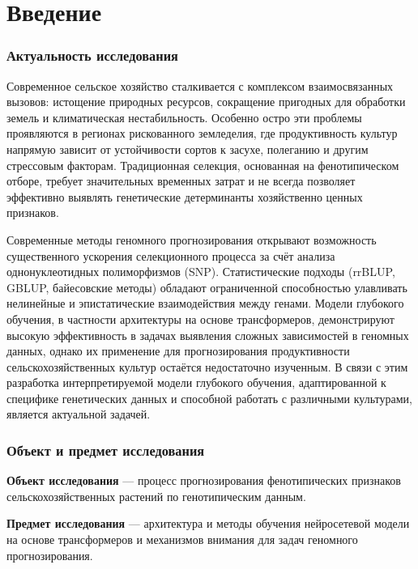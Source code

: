 \chapter*{Введение} %



\subsection*{Актуальность исследования}
Современное сельское хозяйство сталкивается с комплексом взаимосвязанных 
вызовов: истощение природных ресурсов, сокращение пригодных для обработки 
земель и климатическая нестабильность.\cite{Manthena2022, Budhlakoti2022} Особенно остро эти проблемы 
проявляются в регионах рискованного земледелия, где продуктивность 
культур напрямую зависит от устойчивости сортов к засухе, полеганию 
и другим стрессовым факторам. Традиционная селекция, основанная на 
фенотипическом отборе, требует значительных временных затрат и не всегда 
позволяет эффективно выявлять генетические детерминанты хозяйственно 
ценных признаков.\cite{Crossa2017} 

Современные методы геномного прогнозирования открывают возможность 
существенного ускорения селекционного процесса за счёт анализа 
однонуклеотидных полиморфизмов (SNP). Статистические подходы 
(rrBLUP, GBLUP, байесовские методы) обладают ограниченной способностью 
улавливать нелинейные и эпистатические взаимодействия между генами. 
Модели глубокого обучения, в частности архитектуры на основе трансформеров, 
демонстрируют высокую эффективность в задачах выявления сложных 
зависимостей в геномных данных, однако их применение для прогнозирования 
продуктивности сельскохозяйственных культур остаётся недостаточно 
изученным. В связи с этим разработка интерпретируемой модели глубокого 
обучения, адаптированной к специфике генетических данных и способной 
работать с различными культурами, является актуальной задачей.

\subsection*{Объект и предмет исследования}
\textbf{Объект исследования} — процесс прогнозирования фенотипических 
признаков сельскохозяйственных растений по генотипическим данным.

\textbf{Предмет исследования} — архитектура и методы обучения нейросетевой 
модели на основе трансформеров и механизмов внимания для задач геномного 
прогнозирования.

